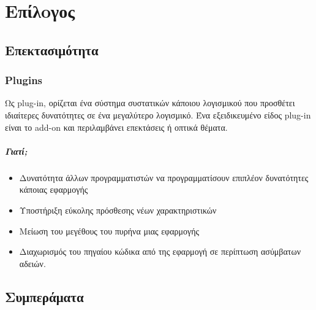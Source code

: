 \chapter{Επίλoγος}

\section{Επεκτασιμότητα}	
	\subsection{Plugins}
	Ως plug-in, ορίζεται ένα σύστημα συστατικών κάποιου λογισμικού που προσθέτει ιδιαίτερες δυνατότητες σε ένα μεγαλύτερο λογισμικό. Ένα εξειδικευμένο είδος plug-in είναι το add-on και περιλαμβάνει επεκτάσεις ή οπτικά θέματα.	
	\paragraph{Γιατί;}
	\begin{itemize}
		\item Δυνατότητα άλλων προγραμματιστών να προγραμματίσουν επιπλέον δυνατότητες κάποιας εφαρμογής
		\item Υποστήριξη εύκολης πρόσθεσης νέων χαρακτηριστικών
		\item Μείωση του μεγέθους του πυρήνα μιας εφαρμογής
		\item Διαχωρισμός του πηγαίου κώδικα από της εφαρμογή σε περίπτωση ασύμβατων αδειών.
	\end{itemize}
\section{Συμπεράματα}

